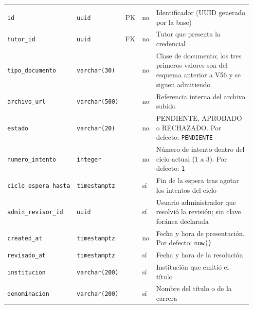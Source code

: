{\small
\begin{xltabular}{\textwidth}{@{}>{\raggedright\arraybackslash}p{3.6cm} >{\raggedright\arraybackslash}p{2.3cm} >{\raggedright\arraybackslash}p{1cm} >{\centering\arraybackslash}p{0.85cm} L@{}}
    \toprule
     &  &  &  &  \\
    \midrule
    \endfirsthead
    \toprule
     &  &  &  &  \\
    \midrule
    \endhead
    \bottomrule
    \endfoot
    \texttt{id} & \texttt{uuid} & PK & no & Identificador (UUID generado por la base) \\
    \texttt{tutor\_\allowbreak{}id} & \texttt{uuid} & FK & no & Tutor que presenta la credencial \\
    \texttt{tipo\_\allowbreak{}documento} & \texttt{varchar(\allowbreak{}30)} &  & no & Clase de documento; los tres primeros valores son del esquema anterior a V56 y se siguen admitiendo \\
    \texttt{archivo\_\allowbreak{}url} & \texttt{varchar(\allowbreak{}500)} &  & no & Referencia interna del archivo subido \\
    \texttt{estado} & \texttt{varchar(\allowbreak{}20)} &  & no & PENDIENTE, APROBADO o RECHAZADO. Por defecto: \texttt{\textquotesingle{}PENDIENTE\textquotesingle{}} \\
    \texttt{numero\_\allowbreak{}intento} & \texttt{integer} &  & no & Número de intento dentro del ciclo actual (1 a 3). Por defecto: \texttt{1} \\
    \texttt{ciclo\_\allowbreak{}espera\_\allowbreak{}hasta} & \texttt{timestamptz} &  & sí & Fin de la espera tras agotar los intentos del ciclo \\
    \texttt{admin\_\allowbreak{}revisor\_\allowbreak{}id} & \texttt{uuid} &  & sí & Usuario administrador que resolvió la revisión; sin clave foránea declarada \\
    \texttt{created\_\allowbreak{}at} & \texttt{timestamptz} &  & no & Fecha y hora de presentación. Por defecto: \texttt{now(\allowbreak{})} \\
    \texttt{revisado\_\allowbreak{}at} & \texttt{timestamptz} &  & sí & Fecha y hora de la resolución \\
    \texttt{institucion} & \texttt{varchar(\allowbreak{}200)} &  & sí & Institución que emitió el título \\
    \texttt{denominacion} & \texttt{varchar(\allowbreak{}200)} &  & sí & Nombre del título o de la carrera \\

\end{xltabular}}
